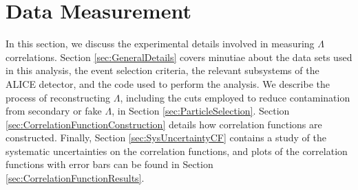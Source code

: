 \chapter{Data Measurement}
\label{sec:DataMeasurement}

In this section, we discuss the experimental details involved in measuring $\Lambda$ correlations.
Section \ref{sec:GeneralDetails} covers minutiae about the data sets used in this analysis, the event selection criteria, the relevant subsystems of the ALICE detector, and the code used to perform the analysis.
We describe the process of reconstructing $\Lambda$, including the cuts employed to reduce contamination from secondary or fake $\Lambda$, in Section \ref{sec:ParticleSelection}.
Section \ref{sec:CorrelationFunctionConstruction} details how correlation functions are constructed.
Finally, Section \ref{sec:SysUncertaintyCF} contains a study of the systematic uncertainties on the correlation functions, and plots of the correlation functions with error bars can be found in Section \ref{sec:CorrelationFunctionResults}.





